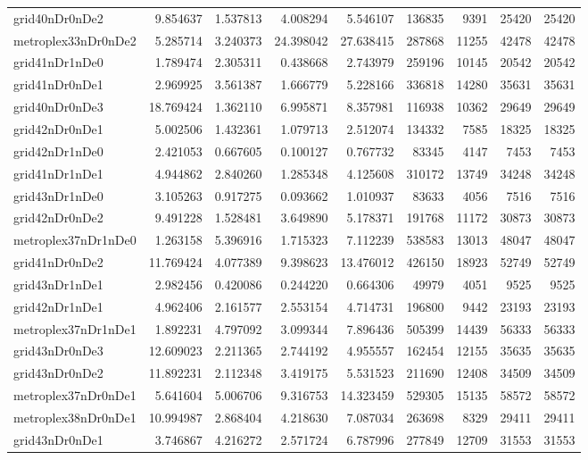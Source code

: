 \begin{longtable}{|l|r|r|r|r|r|r|r|r|}
grid40nDr0nDe2 & 9.854637 & 1.537813 & 4.008294 & 5.546107 & 136835 & 9391 & 25420 & 25420 \\
metroplex33nDr0nDe2 & 5.285714 & 3.240373 & 24.398042 & 27.638415 & 287868 & 11255 & 42478 & 42478 \\
grid41nDr1nDe0 & 1.789474 & 2.305311 & 0.438668 & 2.743979 & 259196 & 10145 & 20542 & 20542 \\
grid41nDr0nDe1 & 2.969925 & 3.561387 & 1.666779 & 5.228166 & 336818 & 14280 & 35631 & 35631 \\
grid40nDr0nDe3 & 18.769424 & 1.362110 & 6.995871 & 8.357981 & 116938 & 10362 & 29649 & 29649 \\
grid42nDr0nDe1 & 5.002506 & 1.432361 & 1.079713 & 2.512074 & 134332 & 7585 & 18325 & 18325 \\
grid42nDr1nDe0 & 2.421053 & 0.667605 & 0.100127 & 0.767732 & 83345 & 4147 & 7453 & 7453 \\
grid41nDr1nDe1 & 4.944862 & 2.840260 & 1.285348 & 4.125608 & 310172 & 13749 & 34248 & 34248 \\
grid43nDr1nDe0 & 3.105263 & 0.917275 & 0.093662 & 1.010937 & 83633 & 4056 & 7516 & 7516 \\
grid42nDr0nDe2 & 9.491228 & 1.528481 & 3.649890 & 5.178371 & 191768 & 11172 & 30873 & 30873 \\
metroplex37nDr1nDe0 & 1.263158 & 5.396916 & 1.715323 & 7.112239 & 538583 & 13013 & 48047 & 48047 \\
grid41nDr0nDe2 & 11.769424 & 4.077389 & 9.398623 & 13.476012 & 426150 & 18923 & 52749 & 52749 \\
grid43nDr1nDe1 & 2.982456 & 0.420086 & 0.244220 & 0.664306 & 49979 & 4051 & 9525 & 9525 \\
grid42nDr1nDe1 & 4.962406 & 2.161577 & 2.553154 & 4.714731 & 196800 & 9442 & 23193 & 23193 \\
metroplex37nDr1nDe1 & 1.892231 & 4.797092 & 3.099344 & 7.896436 & 505399 & 14439 & 56333 & 56333 \\
grid43nDr0nDe3 & 12.609023 & 2.211365 & 2.744192 & 4.955557 & 162454 & 12155 & 35635 & 35635 \\
grid43nDr0nDe2 & 11.892231 & 2.112348 & 3.419175 & 5.531523 & 211690 & 12408 & 34509 & 34509 \\
metroplex37nDr0nDe1 & 5.641604 & 5.006706 & 9.316753 & 14.323459 & 529305 & 15135 & 58572 & 58572 \\
metroplex38nDr0nDe1 & 10.994987 & 2.868404 & 4.218630 & 7.087034 & 263698 & 8329 & 29411 & 29411 \\
grid43nDr0nDe1 & 3.746867 & 4.216272 & 2.571724 & 6.787996 & 277849 & 12709 & 31553 & 31553 \\

\end{longtable}
